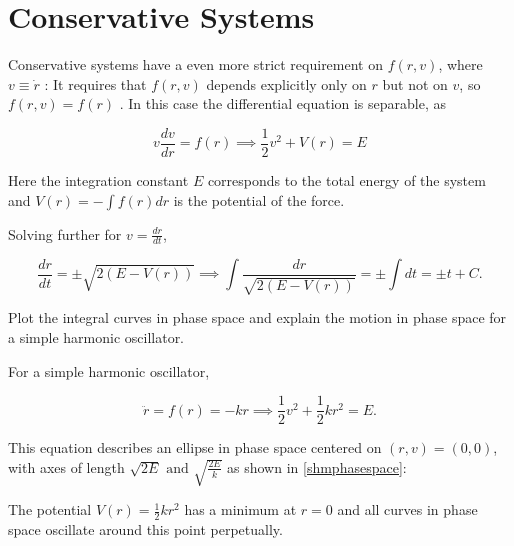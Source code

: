 \documentclass[english,a4paper,12pt]{report}
\begin{document}
\section{Conservative Systems}

Conservative systems have a even more strict requirement on \(f(r,v)\), where \(v \equiv \dot{r} \) : It requires that \(f(r,v)\) depends explicitly only on \(r\) but not on \(v\), so \(f(r,v) = f(r)\) . In this case the differential equation is separable, as

\begin{equation}
    v\frac{dv}{dr} = f(r) \implies \frac{1}{2} v^2+ V(r) = E
\end{equation}

Here the integration constant \(E\) corresponds to the total energy of the system and \(V(r) = - \int f(r)dr\) is the potential of the force. 

Solving further for \(v = \frac{dr}{dt} \), 

\begin{equation}
    \frac{dr}{dt} = \pm \sqrt{2(E-V(r))} \implies \int \frac{dr}{\sqrt{2(E-V(r))} } = \pm \int dt = \pm t + C. 
\end{equation}

{Plot the integral curves in phase space and explain the motion in phase space for a simple harmonic oscillator.}
{For a simple harmonic oscillator,

\begin{equation}
    \ddot{r} = f(r) = -kr \implies  \frac{1}{2}v^2 + \frac{1}{2}kr^2 = E . 
\end{equation}

This equation describes an ellipse in phase space centered on \((r,v) = (0,0)\), with axes of length \(\sqrt{2E} \text { and } \sqrt{\frac{2E}{k} }  \) as shown in \cref{shmphasespace}:

The potential \(V(r) = \frac{1}{2} kr^2 \) has a minimum at \(r=0\) and all curves in phase space oscillate around this point perpetually.  
} 
\end{document}
